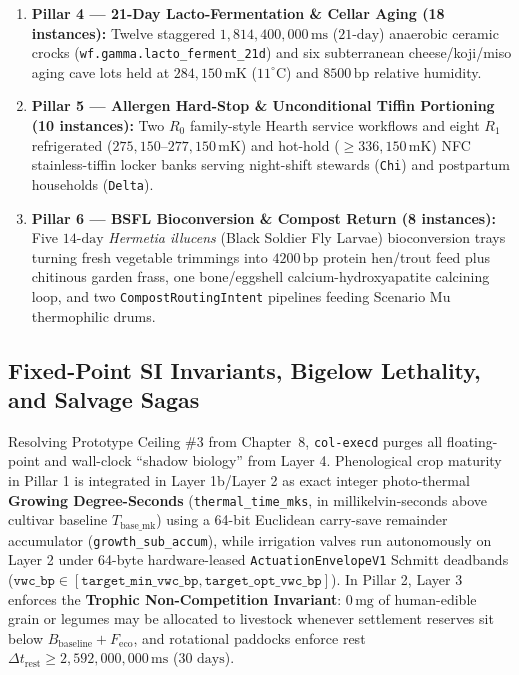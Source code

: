 \begin{enumerate}
    \item \textbf{Pillar 4 --- 21-Day Lacto-Fermentation \& Cellar Aging (18 instances):}
    Twelve staggered $1{,}814{,}400{,}000\,\mathrm{ms}$ ($21\text{-day}$) anaerobic ceramic
    crocks (\texttt{wf.gamma.lacto\_ferment\_21d}) and six subterranean cheese/koji/miso
    aging cave lots held at $284{,}150\,\mathrm{mK}$ ($11^\circ\mathrm{C}$) and $8500\,\mathrm{bp}$
    relative humidity.
    \item \textbf{Pillar 5 --- Allergen Hard-Stop \& Unconditional Tiffin Portioning (10 instances):}
    Two $R_0$ family-style Hearth service workflows and eight $R_1$ refrigerated
    ($275{,}150\text{--}277{,}150\,\mathrm{mK}$) and hot-hold ($\ge 336{,}150\,\mathrm{mK}$)
    NFC stainless-tiffin locker banks serving night-shift stewards (\texttt{Chi}) and
    postpartum households (\texttt{Delta}).
    \item \textbf{Pillar 6 --- BSFL Bioconversion \& Compost Return (8 instances):}
    Five $14\text{-day}$ \textit{Hermetia illucens} (Black Soldier Fly Larvae) bioconversion trays
    turning fresh vegetable trimmings into $4200\,\mathrm{bp}$ protein hen/trout feed plus
    chitinous garden frass, one bone/eggshell calcium-hydroxyapatite calcining loop, and two
    \texttt{CompostRoutingIntent} pipelines feeding Scenario Mu thermophilic drums.
\end{enumerate}

\subsection{Fixed-Point SI Invariants, Bigelow Lethality, and Salvage Sagas}

Resolving Prototype Ceiling \#3 from Chapter~8, \texttt{col-execd} purges all floating-point
and wall-clock ``shadow biology'' from Layer 4. Phenological crop maturity in Pillar 1 is
integrated in Layer 1b/Layer 2 as exact integer photo-thermal \textbf{Growing Degree-Seconds}
(\texttt{thermal\_time\_mks}, in millikelvin-seconds above cultivar baseline
$T_{\mathrm{base\_mk}}$) using a 64-bit Euclidean carry-save remainder accumulator
(\texttt{growth\_sub\_accum}), while irrigation valves run autonomously on Layer 2 under
64-byte hardware-leased \texttt{ActuationEnvelopeV1} Schmitt deadbands
($\mathtt{vwc\_bp} \in [\mathtt{target\_min\_vwc\_bp}, \mathtt{target\_opt\_vwc\_bp}]$). In
Pillar 2, Layer 3 enforces the \textbf{Trophic Non-Competition Invariant}: $0\,\mathrm{mg}$
of human-edible grain or legumes may be allocated to livestock whenever settlement reserves
sit below $B_{\mathrm{baseline}} + F_{\mathrm{eco}}$, and rotational paddocks enforce rest
$\Delta t_{\mathrm{rest}} \ge 2{,}592{,}000{,}000\,\mathrm{ms}$ ($30\text{ days}$).

